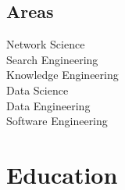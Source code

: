 \documentclass{friggeri-cv}
\begin{document}
\begin{aside}
\section{Areas}
{\small Network Science\\Search Engineering\\Knowledge Engineering\\Data Science\\Data Engineering\\Software Engineering}
\end{aside}


\section{Education}
\end{document}
